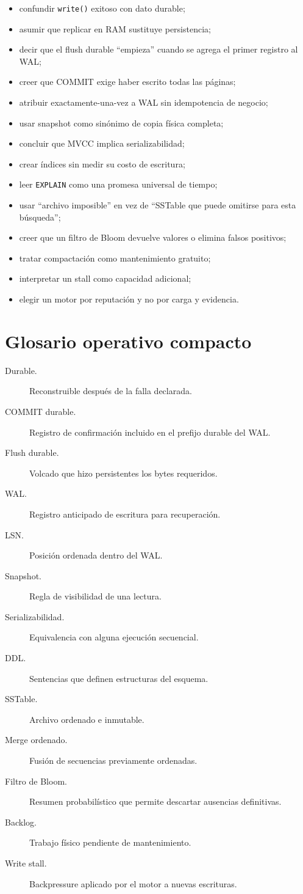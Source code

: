 \documentclass[variant=apuntes,cover=institutional,mode=screen]{ua-engineering-v6-article}
\begin{document}
\begin{itemize}
\item confundir \texttt{write()} exitoso con dato durable;
\item asumir que replicar en RAM sustituye persistencia;
\item decir que el flush durable ``empieza'' cuando se agrega el primer registro al WAL;
\item creer que COMMIT exige haber escrito todas las páginas;
\item atribuir exactamente-una-vez a WAL sin idempotencia de negocio;
\item usar snapshot como sinónimo de copia física completa;
\item concluir que MVCC implica serializabilidad;
\item crear índices sin medir su costo de escritura;
\item leer \texttt{EXPLAIN} como una promesa universal de tiempo;
\item usar ``archivo imposible'' en vez de ``SSTable que puede omitirse para esta búsqueda'';
\item creer que un filtro de Bloom devuelve valores o elimina falsos positivos;
\item tratar compactación como mantenimiento gratuito;
\item interpretar un stall como capacidad adicional;
\item elegir un motor por reputación y no por carga y evidencia.
\end{itemize}

\section{Glosario operativo compacto}

\begin{description}
\item[Durable.] Reconstruible después de la falla declarada.
\item[COMMIT durable.] Registro de confirmación incluido en el prefijo durable del WAL.
\item[Flush durable.] Volcado que hizo persistentes los bytes requeridos.
\item[WAL.] Registro anticipado de escritura para recuperación.
\item[LSN.] Posición ordenada dentro del WAL.
\item[Snapshot.] Regla de visibilidad de una lectura.
\item[Serializabilidad.] Equivalencia con alguna ejecución secuencial.
\item[DDL.] Sentencias que definen estructuras del esquema.
\item[SSTable.] Archivo ordenado e inmutable.
\item[Merge ordenado.] Fusión de secuencias previamente ordenadas.
\item[Filtro de Bloom.] Resumen probabilístico que permite descartar ausencias definitivas.
\item[Backlog.] Trabajo físico pendiente de mantenimiento.
\item[Write stall.] Backpressure aplicado por el motor a nuevas escrituras.
\end{description}
\end{document}
